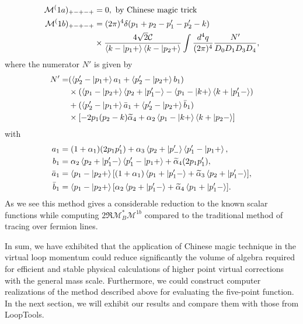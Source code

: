 \begin{align}
\mathcal{M}^(1a)_{+-+-+}&=0,\text{  by Chinese magic trick}\nonumber\\
\mathcal{M}^(1b)_{+-+-+}&=(2\pi)^4\delta (p_1+p_2-p'_1-p'_2-k)\nonumber\\
&\times\frac{4\sqrt{2}\mathcal{C}}{\braket{k-|p_1+}\braket{k-|p_2+}}\int\frac{d^4q}{(2\pi)^4}\frac{N'}{D_0D_1D_3D_4},
\end{align}
where the numerator $N'$ is given by
\begin{align}
N'=&(\braket{p'_2-|p_1+}a_1+\braket{p'_2-|p_2+}b_1)\nonumber\\
&\times(\braket{p_1-|p_2+}\braket{p_2+|p'_1-}-\braket{p_1-|k+}\braket{k+|p'_1-})\nonumber\\
&+(\braket{p'_2-|p_1+}\bar{a}_1+\braket{p'_2-|p_2+}\bar{b}_1)\nonumber\\
&\times[-2p_1(p_2-k)\widetilde{\alpha}_4+\alpha_2\braket{p_1-|k+}\braket{k+|p_2-}]
\end{align}
with
\begin{align}
a_1&=(1+\alpha_1)(2p_1p'_1)+\alpha_3\braket{p_2+|p'_-}\braket{p'_1-|p_1+},\nonumber\\
b_1&=\alpha_2\braket{p_2+|p'_1-}\braket{p'_1-|p_1+}+\widetilde{\alpha}_4(2p_1p'_1),\nonumber\\
\bar{a}_1&=\braket{p_1-|p_2+}[(1+\alpha_1)\braket{p_1+|p'_1-}+\widetilde{\alpha}_3\braket{p_2+|p'_1-}],\nonumber\\
\bar{b}_1&=\braket{p_1-|p_2+}[\alpha_2\braket{p_2+|p'_1-}+\widetilde{\alpha}_4\braket{p_1+|p'_1-}].
\end{align}
As we see this method gives a considerable reduction to the known scalar functions  while computing $2\Re\mathcal{M}_B^\ast\mathcal{M}^{1b}$ compared to the traditional method of tracing over fermion lines.

In sum, we have exhibited that the application of Chinese magic technique in the virtual loop momentum could reduce significantly the volume of algebra required for efficient and stable physical calculations of higher point virtual corrections with the general mass scale. Furthermore, we could construct computer realizations of the method described above for evaluating the five-point function. In the next section, we will exhibit our results and compare them with those from LoopTools.
\newpage
